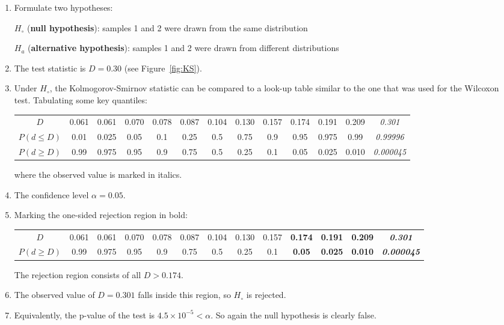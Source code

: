 \begin{enumerate}
\item  Formulate two hypotheses:

  $H_\circ$ (\textbf{null hypothesis}):
  samples 1 and 2 were drawn from the same distribution

  $H_a$ (\textbf{alternative hypothesis}):
  samples 1 and 2 were drawn from different distributions
  
\item The test statistic is $D=0.30$ (see Figure~\ref{fig:KS}).

\item Under $H_\circ$, the Kolmogorov-Smirnov statistic can be
  compared to a look-up table similar to the one that was used for the
  Wilcoxon test. Tabulating some key quantiles:
  \begin{center}
    \begin{tabular}{c|c@{\gap}c@{\gap}c@{\gap}c@{\gap}
        c@{\gap}c@{\gap}c@{\gap}c@{\gap}c@{\gap}c@{\gap}c@{\gap}c}
      $D$ & 0.061 & 0.061 & 0.070 & 0.078 & 0.087 & 0.104 &
      0.130 & 0.157 & 0.174 & 0.191 & 0.209 & \emph{0.301}\\
      $P(d\leq{D})$ & 0.01 & 0.025 & 0.05 & 0.1 & 0.25 &
      0.5 & 0.75 & 0.9 & 0.95 & 0.975 & 0.99 & \emph{0.99996}\\
      $P(d\geq{D})$ & 0.99 & 0.975 & 0.95 & 0.9 & 0.75 & 0.5 &
      0.25 & 0.1 & 0.05 & 0.025 & 0.010 & \emph{0.000045}
    \end{tabular}
  \end{center}

  \noindent where the observed value is marked in italics.
  
\item The confidence level $\alpha = 0.05$.

\item Marking the one-sided rejection region in bold:
  \begin{center}
    \begin{tabular}{c|c@{\gap}c@{\gap}c@{\gap}c@{\gap}
        c@{\gap}c@{\gap}c@{\gap}c@{\gap}c@{\gap}c@{\gap}c@{\gap}c}
      $D$ & 0.061 & 0.061 & 0.070 & 0.078 & 0.087 & 0.104 &
      0.130 & 0.157 & \textbf{0.174} & \textbf{0.191} &
      \textbf{0.209} & \textbf{\emph{0.301}}\\
      $P(d\geq{D})$ & 0.99 & 0.975 & 0.95 & 0.9 & 0.75 & 0.5 &
      0.25 & 0.1 & \textbf{0.05} & \textbf{0.025} & \textbf{0.010} &
      \emph{\textbf{0.000045}}
    \end{tabular}
  \end{center}

  The rejection region consists of all $D>{0.174}$.

\item The observed value of $D=0.301$ falls inside this region, so
  $H_\circ$ is rejected.

\item Equivalently, the p-value of the test is
  $4.5\times{10}^{-5}<\alpha$.  So again the null hypothesis is
  clearly false.
  
\end{enumerate}

